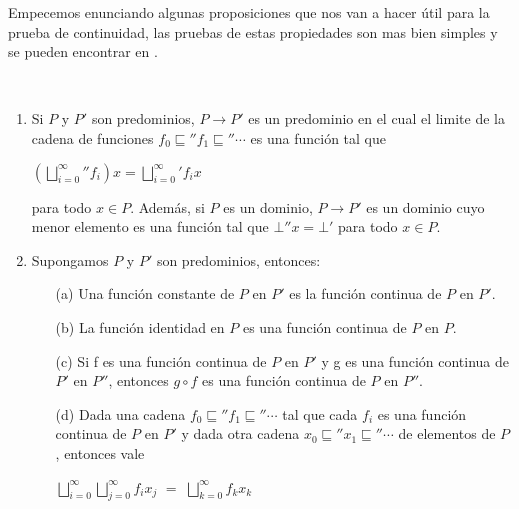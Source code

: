 Empecemos enunciando algunas proposiciones que nos van a hacer \'util para
la prueba de continuidad, las pruebas de estas propiedades son mas bien simples
y se pueden encontrar en \cite{reynolds2009theories}.

\newpage

\begin{proposition}\

\begin{enumerate}

\item Si $P$ y $P'$ son predominios, $P \rightarrow P'$ es un predominio en
el cual el limite de la cadena de funciones $f_0 \sqsubseteq'' f_1 \sqsubseteq'' \cdots$ 
es una funci\'on tal que 

\begin{center}
$({\bigsqcup\limits^{\infty}_{i=0}}'' f_{i})x = {\bigsqcup\limits^{\infty}_{i=0}}' f_{i} x$
\end{center}

para todo $x \in P$. Adem\'as, si $P$ es un dominio, $P \rightarrow P'$ es un dominio
cuyo menor elemento es una funci\'on tal que $\bot'' x = \bot'$ para todo $x \in P$.

\item Supongamos $P$ y $P'$ son predominios, entonces:

\begin{enumerate}
\item[(a)] Una funci\'on constante de $P$ en $P'$ es la funci\'on continua de $P$ en $P'$.\\

\item[(b)] La funci\'on identidad en $P$ es una funci\'on continua de $P$ en $P$.\\

\item[(c)] Si f es una funci\'on continua de $P$ en $P'$ y g es una funci\'on
continua de $P'$ en $P''$, entonces $g \circ f$ es una funci\'on continua de $P$ en $P''$.\\

\item[(d)] Dada una cadena $f_0 \sqsubseteq'' f_1 \sqsubseteq'' \cdots$ tal que cada $f_i$ es una
funci\'on continua de $P$ en $P'$ y dada otra cadena $x_0 \sqsubseteq'' x_1 \sqsubseteq'' \cdots$ de
elementos de $P$, entonces vale

\begin{center}
${\bigsqcup\limits^{\infty}_{i=0}}{\bigsqcup\limits^{\infty}_{j=0}}f_i x_j$ $=$
${\bigsqcup\limits^{\infty}_{k=0}}f_k x_k$
\end{center}


\end{enumerate}
\end{enumerate}
\end{proposition}
